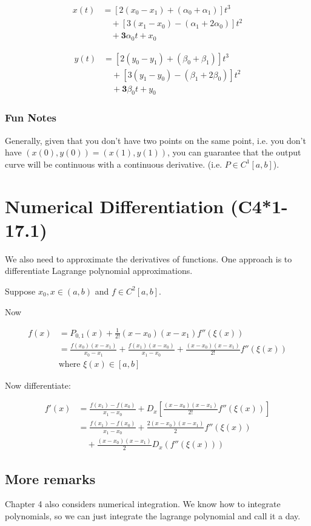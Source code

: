 \begin{align*}
    x(t) &= \left[ 2(x_0 - x_1) + (\alpha_0 + \alpha_1) \right] t^3 \\
         &\quad + \left[ 3(x_1 - x_0) - (\alpha_1 + 2\alpha_0) \right] t^2 \\
         &\quad + \mathbf{3}\alpha_0 t + x_0
\end{align*}

\begin{align*}
    y(t) &= \left[ 2(y_0 - y_1) + (\beta_0 + \beta_1) \right] t^3 \\
         &\quad + \left[ 3(y_1 - y_0) - (\beta_1 + 2\beta_0) \right] t^2 \\
         &\quad + \mathbf{3}\beta_0 t + y_0
\end{align*}

\subsubsection{Fun Notes}

Generally, given that you don't have two points on the same point, i.e. you
don't have
$
  (x(0), y(0)) = (x(1), y(1))
$,
you can guarantee that the output curve will be continuous with a continuous
derivative. (i.e. $P \in C^1[a, b]$).

\section{Numerical Differentiation (C4*1-17.1)}

We also need to approximate the derivatives of functions. One approach is to
differentiate Lagrange polynomial approximations.

Suppose $x_0, x \in (a, b)$ and $f\in C^2[a,b]$.

Now

\begin{align*}
    f(x) &= P_{0,1}(x) + \frac{1}{2!} (x - x_0)(x - x_1) f''(\xi(x)) \\
         &= \frac{f(x_0)(x - x_1)}{x_0 - x_1} + \frac{f(x_1)(x - x_0)}{x_1 - x_0} 
         + \frac{(x - x_0)(x - x_1)}{2!} f''(\xi(x)) \\
         &\text{where } \xi(x) \in [a, b]
\end{align*}

Now differentiate:

\begin{align*}
    f'(x) &= \frac{f(x_1) - f(x_0)}{x_1 - x_0} + D_x \left[ \frac{(x - x_0)(x - x_1)}{2!} f''(\xi(x)) \right] \\
          &= \frac{f(x_1) - f(x_0)}{x_1 - x_0} + \frac{2 (x - x_0)(x - x_1)}{2} f''(\xi(x)) \\
          &\quad + \frac{(x - x_0)(x - x_1)}{2} D_x \left( f''(\xi(x)) \right)
\end{align*}

\subsection{More remarks}
Chapter 4 also considers numerical integration. We know how to integrate
polynomials, so we can just integrate the lagrange polynomial and call it a day.

